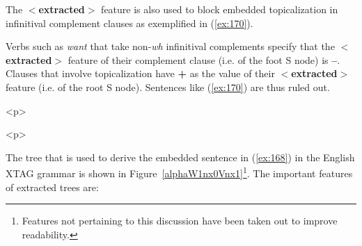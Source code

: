 \beginsentences
{}\label{ex:166} 
\label{ex:167} 
\label{ex:168} 
\label{ex:169} 
\endsentences

The {\bf $<$extracted$>$} feature is also used to block embedded topicalization 
in infinitival complement clauses as exemplified in (\ref{ex:170}). 
\beginsentences
{}\label{ex:170} 
\endsentences

Verbs such as {\em want} that take non-{\em wh} infinitival complements 
specify that the {\bf $<$extracted$>$} feature of their complement clause 
(i.e. of the foot S node) 
is {\bf --}. Clauses that involve topicalization have {\bf +} as the value 
of their {\bf $<$extracted$>$} feature (i.e. of the root S node). 
Sentences like (\ref{ex:170}) are thus ruled out.  
 
\begin{rawhtml} <p> \end{rawhtml}
\centering 
\mbox{} 
\begin{rawhtml} <dl> <dt>{Transitive tree with object extraction: $\alpha$W1nx0Vnx1 <p> </dl> \end{rawhtml}
\label{alphaW1nx0Vnx1} 
\label{2;5,1} 
\begin{rawhtml} <p> \end{rawhtml}
 
 
The tree that is used to derive the embedded sentence in (\ref{ex:168}) in 
the English XTAG grammar is shown in 
Figure~\ref{alphaW1nx0Vnx1}\footnote{Features not pertaining to this   discussion have been taken out to improve readability.}.  The 
important features of extracted trees are: 
 
